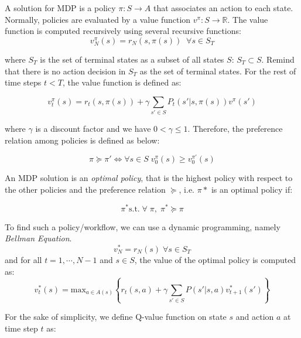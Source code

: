 \documentclass[10pt,journal,compsoc]{IEEEtran}
\begin{document}
A solution for MDP is a policy $\pi: S \longrightarrow A$ that associates an action to each state. Normally, policies are evaluated by a value function $v^{\pi} : S \longrightarrow \mathbb{R}$. The value function is computed recursively using several recursive functions: %
\begin{equation}
v^{\pi}_N(s) = r_N(s, \pi(s)) \;\; \forall s\in S_T
\end{equation}

where $S_T$ is the set of terminal states as a subset of all states $S$: $S_T \subset S$. Remind that there is no action decision in  $S_T$ as the set of terminal states. For the rest of time steps $t<T$, the value function is defined as:

\begin{equation}\label{eq:value-func}
v^{\pi}_t(s) =  r_t(s,\pi(s)) + \gamma \sum_{s' \in S} P_t(s'|s,\pi(s)) v^{\pi}(s')
\end{equation}

where $\gamma$ is a discount factor and we have $ 0 < \gamma \leq 1$. Therefore, the preference relation among policies is defined as below:

\begin{equation}
\pi \succeq \pi' \Leftrightarrow \forall s \in S \; v_0^{\pi}(s) \geq v_0^{\pi'}(s)
\end{equation}

An MDP solution is an \emph{optimal policy}, that is the highest policy with respect to the other policies and the preference relation $\succeq$, i.e. $\pi *$ is an optimal policy if: 

\begin{equation}
\pi^* \text{s.t.} \; \forall \; \pi, \; \pi^* \succeq \pi
\end{equation}

To find such a policy/workflow, we can use a dynamic programming, namely \emph{Bellman Equation}. 
\begin{equation}
v_N^* = r_N(s) \; \forall s\in S_T
\end{equation}
%
and for all $t= 1, \cdots, N-1$ and $s \in S$, the value of the optimal policy is computed as:
\begin{equation}\label{eq:bellman}
v_t^*(s) =\text{max}_{a \in A(s)} \left \{ r_t(s,a) + \gamma \sum_{s' \in S} P(s'|s,a) v_{t+1}^*(s') \right \} 
\end{equation}

For the sake of simplicity, we define Q-value function on state $s$ and action $a$ at time step $t$ as:
\end{document}
